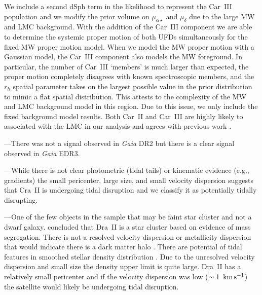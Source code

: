 \documentclass[twocolumn]{aastex63}
\begin{document}
We include a second dSph term in the likelihood to represent the Car~III population and we modify the prior volume on $\mu_{\alpha \star}$ and $\mu_{\delta}$ due to the large MW and LMC background.
With the addition of the Car~III component we are able to determine the systemic proper motion of both UFDs simultaneously for the fixed MW proper motion model.
When we model the MW proper motion with a Gaussian model, the Car~III component also  models the MW foreground. In particular, the number of Car~III `members' is much larger than expected, the proper motion completely disagrees with known spectroscopic members, and the $r_h$ spatial parameter takes on the largest possible value in the prior distribution to mimic a flat spatial distribution.  This attests to the complexity of the MW and LMC background model in this region.
Due to this issue, we only include the fixed background model results. 
Both Car~II and Car~III are highly likely to associated with the LMC in our analysis and  agrees with previous work \citep[e.g.,][]{Erkal2020MNRAS.495.2554E, Battaglia2022A&A...657A..54B}.


---There was not a signal observed in {\it Gaia} DR2 \citep{Pace2019ApJ...875...77P, McConnachie2020AJ....160..124M} but there is a clear signal observed in {\it Gaia} EDR3.  


---While there is not clear photometric (tidal tails) or kinematic evidence (e.g., gradients) \citep{Ji2021ApJ...921...32J} the small pericenter, large size, and small velocity dispersion suggests that Cra~II is undergoing tidal disruption \citep{Sanders2018MNRAS.478.3879S, Borukhovetskaya2022MNRAS.512.5247B} and we classify it as potentially tidally disrupting. 


---One of the few objects in the sample that may be faint star cluster and not a dwarf galaxy. \citet{Baumgardt2022MNRAS.510.3531B} concluded that Dra~II is a star cluster  based on  evidence of mass segregation. 
There is not a resolved velocity dispersion or metallicity dispersion that would indicate there is a dark matter halo \citep{Longeard2018MNRAS.480.2609L}. 
There are potential of tidal features in smoothed stellar density distribution  \citep{Longeard2018MNRAS.480.2609L}. Due to the unresolved velocity dispersion and small size the density upper limit is quite large. Dra~II has a relatively small pericenter and if  the velocity dispersion was low ($\sim 1 ~\mathrm{\,km} \mathrm{\,s}^{-1}$) the satellite would likely be undergoing tidal disruption.   
\end{document}
